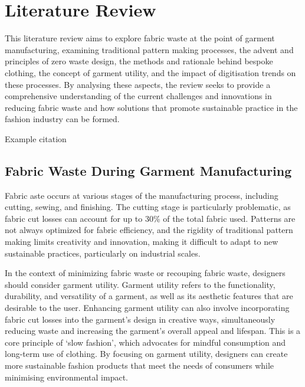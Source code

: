 \chapter{Literature Review}
This literature review aims to explore fabric waste at the point of garment manufacturing, examining traditional pattern making processes, the advent and principles of zero waste design, the methods and rationale behind bespoke clothing, the concept of garment utility, and the impact of digitisation trends on these processes. By analysing these aspects, the review seeks to provide a comprehensive understanding of the current challenges and innovations in reducing fabric waste and how solutions that promote sustainable practice in the fashion industry can be formed. 

Example citation \cite{aldrich_metric_2015}

\section{Fabric Waste During Garment Manufacturing}
Fabric aste occurs at various stages of the manufacturing process, including cutting, sewing, and finishing. The cutting stage is particularly problematic, as fabric cut losses can account for up to 30\% of the total fabric used. Patterns are not always optimized for fabric efficiency, and the rigidity of traditional pattern making limits creativity and innovation, making it difficult to adapt to new sustainable practices, particularly on industrial scales.

In the context of minimizing fabric waste or recouping fabric waste, designers should consider garment utility. Garment utility refers to the functionality, durability, and versatility of a garment, as well as its aesthetic features that are desirable to the user. Enhancing garment utility can also involve incorporating fabric cut losses into the garment’s design in creative ways, simultaneously reducing waste and increasing the garment’s overall appeal and lifespan. This is a core principle of ‘slow fashion’, which advocates for mindful consumption and long-term use of clothing. By focusing on garment utility, designers can create more sustainable fashion products that meet the needs of consumers while minimising environmental impact.

